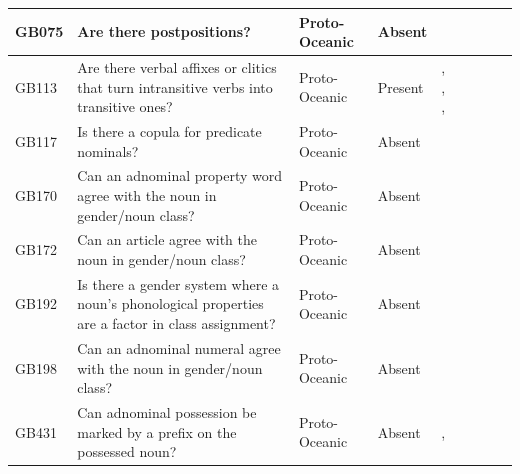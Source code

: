\documentclass[a4paper,10pt]{article} %
\begin{document}
\begin{landscape}
\begin{longtable}{| p{2cm}| p{3cm}| p{2.5cm}|p{2cm}|p{2cm}|p{2cm}|p{2cm}|p{2cm}|p{2cm}|}
GB075&Are there postpositions?&Proto-Oceanic&Absent&\citet[500]{ross2004morphosyntactic}& \cellcolor{hedvig_lightgreen!50}{True Negative} & \cellcolor{hedvig_yellow!50}{Half} & \cellcolor{hedvig_yellow!50}{True Negative} & \cellcolor{hedvig_yellow!50}{Half} \\ \hline
GB113&Are there verbal affixes or clitics that turn intransitive verbs into transitive ones?&Proto-Oceanic&Present&\citet[171]{pawley1973some}, \citet[123]{wilson1982proto}, \citet[80, 92]{lynchrosscrowley_proto_grammar_oceanic}, \citet[112]{evans2003study}& \cellcolor{hedvig_lightgreen!50}{True Positive} & \cellcolor{hedvig_yellow!50}{Half} & \cellcolor{hedvig_lightgreen!50}{True Positive} & \cellcolor{hedvig_yellow!50}{Half} \\ \hline
GB117&Is there a copula for predicate nominals?&Proto-Oceanic&Absent&\citet[86]{lynchrosscrowley_proto_grammar_oceanic}& \cellcolor{hedvig_lightgreen!50}{True Negative} & \cellcolor{hedvig_yellow!50}{Half} & \cellcolor{hedvig_yellow!50}{True Negative} & \cellcolor{hedvig_yellow!50}{Half} \\ \hline
GB170&Can an adnominal property word agree with the noun in gender/noun class?&Proto-Oceanic&Absent&\citet[498]{ross2004morphosyntactic}& \cellcolor{hedvig_lightgreen!50}{True Negative} & \cellcolor{hedvig_yellow!50}{Half} & \cellcolor{hedvig_yellow!50}{True Negative} & \cellcolor{hedvig_yellow!50}{Half} \\ \hline
GB172&Can an article agree with the noun in gender/noun class?&Proto-Oceanic&Absent&\citet[498]{ross2004morphosyntactic}& \cellcolor{hedvig_lightgreen!50}{True Negative} & \cellcolor{hedvig_yellow!50}{Half} & \cellcolor{hedvig_yellow!50}{True Negative} & \cellcolor{hedvig_yellow!50}{Half} \\ \hline
GB192&Is there a gender system where a noun's phonological properties are a factor in class assignment?&Proto-Oceanic&Absent&\citet[498]{ross2004morphosyntactic}& \cellcolor{hedvig_lightgreen!50}{True Negative} & \cellcolor{hedvig_yellow!50}{Half} & \cellcolor{hedvig_yellow!50}{True Negative} & \cellcolor{hedvig_red!50}{False Positive} \\ \hline
GB198&Can an adnominal numeral agree with the noun in gender/noun class?&Proto-Oceanic&Absent&\citet[498]{ross2004morphosyntactic}& \cellcolor{hedvig_lightgreen!50}{True Negative} & \cellcolor{hedvig_yellow!50}{Half} & \cellcolor{hedvig_yellow!50}{True Negative} & \cellcolor{hedvig_yellow!50}{Half} \\ \hline
GB431&Can adnominal possession be marked by a prefix on the possessed noun?&Proto-Oceanic&Absent&\citet[117]{pawley1973some}, \citet[494, 497]{ross2004morphosyntactic}& \cellcolor{hedvig_lightgreen!50}{True Negative} & \cellcolor{hedvig_yellow!50}{Half} & \cellcolor{hedvig_yellow!50}{True Negative} & \cellcolor{hedvig_yellow!50}{Half} \\ \hline

\end{longtable}
\end{landscape}
\end{document}
